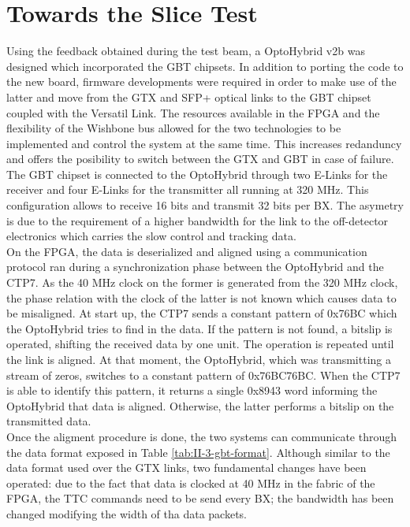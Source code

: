   \section{Towards the Slice Test}

    Using the feedback obtained during the test beam, a OptoHybrid v2b was designed which incorporated the GBT chipsets. In addition to porting the code to the new board, firmware developments were required in order to make use of the latter and move from the GTX and SFP+ optical links to the GBT chipset coupled with the Versatil Link. The resources available in the FPGA and the flexibility of the Wishbone bus allowed for the two technologies to be implemented and control the system at the same time. This increases redanduncy and offers the posibility to switch between the GTX and GBT in case of failure. \\

    The GBT chipset is connected to the OptoHybrid through two E-Links for the receiver and four E-Links for the transmitter all running at 320 MHz. This configuration allows to receive 16 bits and transmit 32 bits per BX. The asymetry is due to the requirement of a higher bandwidth for the link to the off-detector electronics which carries the slow control and tracking data. \\

    On the FPGA, the data is deserialized and aligned using a communication protocol ran during a synchronization phase between the OptoHybrid and the CTP7. As the 40 MHz clock on the former is generated from the 320 MHz clock, the phase relation with the clock of the latter is not known which causes data to be misaligned. At start up, the CTP7 sends a constant pattern of 0x76BC which the OptoHybrid tries to find in the data. If the pattern is not found, a bitslip is operated, shifting the received data by one unit. The operation is repeated until the link is aligned. At that moment, the OptoHybrid, which was transmitting a stream of zeros, switches to a constant pattern of 0x76BC76BC. When the CTP7 is able to identify this pattern, it returns a single 0x8943 word informing the OptoHybrid that data is aligned. Otherwise, the latter performs a bitslip on the transmitted data. \\

    Once the aligment procedure is done, the two systems can communicate through the data format exposed in Table \ref{tab:II-3-gbt-format}. Although similar to the data format used over the GTX links, two fundamental changes have been operated: due to the fact that data is clocked at 40 MHz in the fabric of the FPGA, the TTC commands need to be send every BX; the bandwidth has been changed modifying the width of tha data packets. \\

